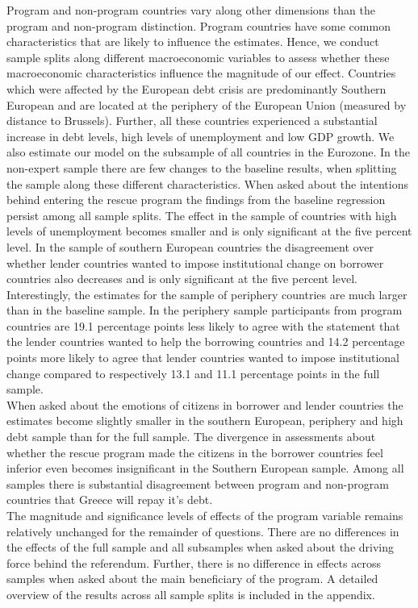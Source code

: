 Program and non-program countries vary along other dimensions than the program and non-program distinction. Program countries have some common characteristics that are likely to influence the estimates. Hence, we conduct sample splits along different macroeconomic variables to assess whether these macroeconomic characteristics influence the magnitude of our effect. Countries which were affected by the European debt crisis are predominantly Southern European and are located at the periphery of the European Union (measured by distance to Brussels). Further, all these countries experienced a substantial increase in debt levels, high levels of unemployment and low GDP growth. We also estimate our model on the subsample of all countries in the Eurozone. In the non-expert sample there are few changes to the baseline results, when splitting the sample along these different characteristics. When asked about the intentions behind entering the rescue program the findings from the baseline regression persist among all sample splits. The effect in the sample of countries with high levels of unemployment becomes smaller and is only significant at the five percent level. In the sample of southern European countries the disagreement over whether lender countries wanted to impose institutional change on borrower countries also decreases and is only significant at the five percent level. Interestingly, the estimates for the sample of periphery countries are much larger than in the baseline sample. In the periphery sample participants from program countries are 19.1 percentage points less likely to agree with the statement that the lender countries wanted to help the borrowing countries and 14.2 percentage points more likely to agree that lender countries wanted to impose institutional change compared to respectively 13.1 and 11.1 percentage points in the full sample.\\
When asked about the emotions of citizens in borrower and lender countries the estimates become slightly smaller in the southern European, periphery and high debt sample than for the full sample. The divergence in assessments about whether the rescue program made the citizens in the borrower countries feel inferior even becomes insignificant in the Southern European sample. Among all samples there is substantial disagreement between program and non-program countries that Greece will repay it's debt. 
\\
The magnitude and significance levels of effects of the program variable remains relatively unchanged for the remainder of questions. There are no differences in the effects of the full sample and all subsamples when asked about the driving force behind the referendum. Further, there is no difference in effects across samples when asked about the main beneficiary of the program. A detailed overview of the results across all sample splits is included in the appendix. 